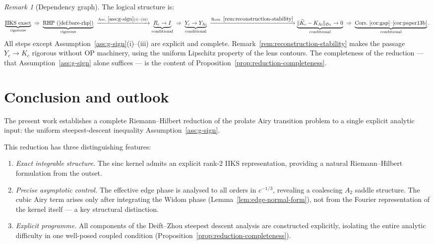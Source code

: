\documentclass[12pt,a4paper]{amsart}
\theoremstyle{definition}
\theoremstyle{remark}
\newtheorem{remark}[theorem]{Remark}
\newcommand{\norm}[1]{\|#1\|}
\begin{document}
\begin{remark}[Dependency graph]
The logical structure is:
\[
  \underbrace{\text{IIKS exact}}_{\text{rigorous}}
  \;\Rightarrow\;
  \underbrace{\text{RHP}~(\ref{def:bare-rhp})}_{\text{rigorous}}
  \;\xrightarrow{\text{Ass.}~\ref{ass:g-sign}\text{(i)--(iii)}}
  \underbrace{R_c\to I}_{\text{conditional}}
  \;\Rightarrow\;
  \underbrace{Y_c\to Y_{\mathrm{Ai}}}_{\text{conditional}}
  \;\xrightarrow{\text{Rem.}~\ref{rem:reconstruction-stability}}
  \underbrace{\norm{\widetilde{K}_c - K_{\mathrm{Ai}}}_{\mathfrak{S}_1}\to 0}_{\text{conditional}}
  \;\Rightarrow\;
  \underbrace{\text{Cors.~\ref{cor:gap}--\ref{cor:paper13b}}}_{\text{conditional}}.
\]
All steps except Assumption~\ref{ass:g-sign}(i)--(iii) are explicit
and complete. Remark~\ref{rem:reconstruction-stability} makes the
passage $Y_c \to K_c$ rigorous without OP machinery, using the
uniform Lipschitz property of the lens contours.
The completeness of the reduction --- that Assumption~\ref{ass:g-sign}
alone suffices --- is the content of
Proposition~\ref{prop:reduction-completeness}.
\end{remark}

\section{Conclusion and outlook}
\label{sec:conclusion}

The present work establishes a complete Riemann--Hilbert reduction
of the prolate Airy transition problem to a single explicit analytic input:
the uniform steepest-descent inequality Assumption~\ref{ass:g-sign}.

This reduction has three distinguishing features:
\begin{enumerate}[label=(\roman*)]
\item \emph{Exact integrable structure.}
The sinc kernel admits an explicit rank-2 IIKS representation,
providing a natural Riemann--Hilbert formulation from the outset.

\item \emph{Precise asymptotic control.}
The effective edge phase is analysed to all orders in $c^{-1/3}$,
revealing a coalescing $A_2$ saddle structure.
The cubic Airy term arises only after integrating the Widom phase
(Lemma~\ref{lem:edge-normal-form}), not from the Fourier representation
of the kernel itself --- a key structural distinction.

\item \emph{Explicit programme.}
All components of the Deift--Zhou steepest descent analysis
are constructed explicitly, isolating the entire analytic difficulty
in one well-posed coupled condition
(Proposition~\ref{prop:reduction-completeness}).
\end{enumerate}
\end{document}
